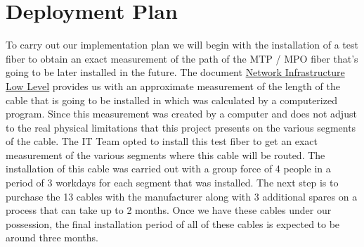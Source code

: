 \newpage

\section{Deployment Plan}

To carry out our implementation plan we will begin with the installation of a test fiber to obtain an exact measurement of the path of the MTP / MPO fiber that's going to be later installed in the future. The document \href{https://confluence.lsstcorp.org/display/IT/Network+Infrastructure+Low-Level+Design+LLD?preview=/139036736/140285500/Telescope-Camera%20Optical%20Fibers%20layout%20v3.pdf}{Network Infrastructure Low Level} provides us with an approximate measurement of the length of the cable that is going to be installed in which was calculated by a computerized program. Since this measurement was created by a computer and does not adjust to the real physical limitations that this project presents on the various segments of the cable. The IT Team opted to install this test fiber to get an exact measurement of the various segments where this cable will be routed.
The installation of this cable was carried out with a group force of 4 people in a period of 3 workdays for each segment that was installed. The next step is to purchase the 13 cables with the manufacturer along with 3 additional spares on a process that can take up to 2 months. Once we have these cables under our possession, the final installation period of all of these cables is expected to be around three months.

\newpage


